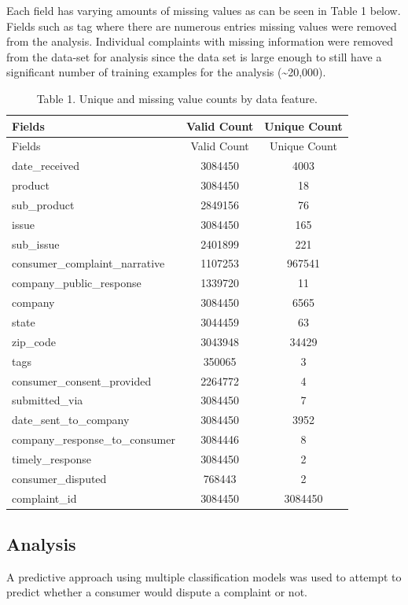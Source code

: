 \documentclass[
  letterpaper,
  DIV=11,
  numbers=noendperiod]{scrartcl}
\begin{document}
Each field has varying amounts of missing values as can be seen in Table
1 below. Fields such as tag where there are numerous entries missing
values were removed from the analysis. Individual complaints with
missing information were removed from the data-set for analysis since
the data set is large enough to still have a significant number of
training examples for the analysis (\textasciitilde20,000).

\begin{longtable}[]{@{}lcc@{}}
\caption{Table 1. Unique and missing value counts by data
feature.}\tabularnewline
\toprule()
Fields & Valid Count & Unique Count \\
\midrule()
\endfirsthead
\toprule()
Fields & Valid Count & Unique Count \\
\midrule()
\endhead
date\_received & 3084450 & 4003 \\
product & 3084450 & 18 \\
sub\_product & 2849156 & 76 \\
issue & 3084450 & 165 \\
sub\_issue & 2401899 & 221 \\
consumer\_complaint\_narrative & 1107253 & 967541 \\
company\_public\_response & 1339720 & 11 \\
company & 3084450 & 6565 \\
state & 3044459 & 63 \\
zip\_code & 3043948 & 34429 \\
tags & 350065 & 3 \\
consumer\_consent\_provided & 2264772 & 4 \\
submitted\_via & 3084450 & 7 \\
date\_sent\_to\_company & 3084450 & 3952 \\
company\_response\_to\_consumer & 3084446 & 8 \\
timely\_response & 3084450 & 2 \\
consumer\_disputed & 768443 & 2 \\
complaint\_id & 3084450 & 3084450 \\
\bottomrule()
\end{longtable}

\hypertarget{analysis}{%
\subsection{Analysis}\label{analysis}}

A predictive approach using multiple classification models was used to
attempt to predict whether a consumer would dispute a complaint or not.
\end{document}
